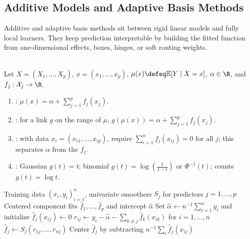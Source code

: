 \subsection{Additive Models and Adaptive Basis Methods}

Additive and adaptive basis methods sit between rigid linear models and fully local learners.  They keep prediction interpretable by building the fitted function from one-dimensional effects, boxes, hinges, or soft routing weights.

\begin{definition} \label{def:sl-generalized-additive-model} \\
Let $X=(X_1,\ldots,X_p)$, $x=(x_1,\ldots,x_p)$, $\mu(x)\defeq\mathbb{E}[Y\mid X=x]$, $\alpha\in\R$, and $f_j:\mathcal X_j\to\R$.
\begin{enumerate}[label=(\roman*)]
\setlength{\itemsep}{0pt}
\item {}: $\mu(x)=\alpha+\sum\limits_{j=1}^p f_j(x_j)$.
\item {}: for a link $g$ on the range of $\mu$, $g(\mu(x))=\alpha+\sum\limits_{j=1}^p f_j(x_j)$.
\item {}: with data $x_i=(x_{i1},\ldots,x_{ip})$, require $\sum\limits_{i=1}^n f_j(x_{ij})=0$ for all $j$; this separates $\alpha$ from the $f_j$.
\item {}: Gaussian $g(t)=t$; binomial $g(t)=\log\left(\frac{t}{1-t}\right)$ or $\Phi^{-1}(t)$; counts $g(t)=\log t$.
\end{enumerate}
\end{definition}

\begin{breakablealgorithm}
\caption{Backfitting for an Additive Regression Model}
\label{alg:sl-additive-backfitting}
\begin{algorithmic}
\Require Training data $(x_i,y_i)_{i=1}^n$, univariate smoothers $S_j$ for predictors $j=1,\ldots,p$
\Ensure Centered component fits $\widehat{f}_1,\ldots,\widehat{f}_p$ and intercept $\widehat{\alpha}$
\State Set $\widehat{\alpha}\gets n^{-1}\sum_{i=1}^ny_i$ and initialize $\widehat{f}_j(x_{ij})\gets0$
\Repeat
{}
\State $r_{ij}\gets y_i-\widehat{\alpha}-\sum_{k\neq j}\widehat{f}_k(x_{ik})$ for $i=1,\ldots,n$
\State $\widehat{f}_j\gets S_j(r_{1j},\ldots,r_{nj})$
\State Center $\widehat{f}_j$ by subtracting $n^{-1}\sum_i\widehat{f}_j(x_{ij})$
\EndFor
{}
\end{algorithmic}
\end{breakablealgorithm}

